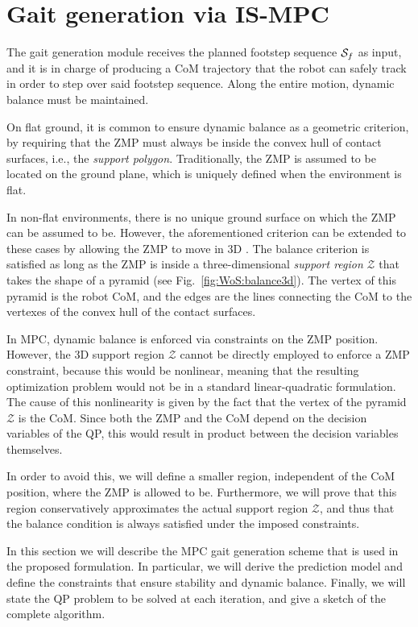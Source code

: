\chapter{Gait generation via IS-MPC}
\label{sec:FAPA:GaitGeneration}
The gait generation module receives the planned footstep sequence ${\cal S}_f$ as input, and it is in charge of producing a CoM trajectory that the robot can safely track in order to step over said footstep sequence. Along the entire motion, dynamic balance must be maintained.

On flat ground, it is common to ensure dynamic balance as a geometric criterion, by requiring that the ZMP must always be inside the convex hull of contact surfaces, i.e., the \emph{support polygon}. Traditionally, the ZMP is assumed to be located on the ground plane, which is uniquely defined when the environment is flat.

In non-flat environments, there is no unique ground surface on which the ZMP can be assumed to be. However, the aforementioned criterion can be extended to these cases by allowing the ZMP to move in 3D \cite{SuImYaCa:2021}. The balance criterion is satisfied as long as the ZMP is inside a three-dimensional \emph{support region} $\mathcal{Z}$ that takes the shape of a pyramid (see Fig.~\ref{fig:WoS:balance3d}). The vertex of this pyramid is the robot CoM, and the edges are the lines connecting the CoM to the vertexes of the convex hull of the contact surfaces.

In MPC, dynamic balance is enforced via constraints on the ZMP position. However, the 3D support region $\mathcal{Z}$ cannot be directly employed to enforce a ZMP constraint, because this would be nonlinear, meaning that the resulting optimization problem would not be in a standard linear-quadratic formulation. The cause of this nonlinearity is given by the fact that the vertex of the pyramid $\mathcal{Z}$ is the CoM. Since both the ZMP and the CoM depend on the decision variables of the QP, this would result in product between the decision variables themselves.

In order to avoid this, we will define a smaller region, independent of the CoM position, where the ZMP is allowed to be. Furthermore, we will prove that this region conservatively approximates the actual support region $\mathcal{Z}$, and thus that the balance condition is always satisfied under the imposed constraints.

In this section we will describe the MPC gait generation scheme that is used in the proposed formulation. In particular, we will derive the prediction model and define the constraints that ensure stability and dynamic balance. Finally, we will state the QP problem to be solved at each iteration, and give a sketch of the complete algorithm.


